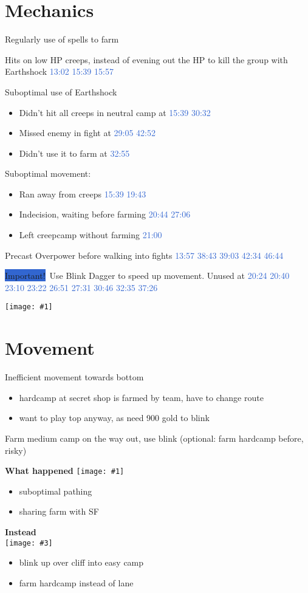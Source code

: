 \documentclass{article}
\newcommand{\gt}{\ensuremath{\;\;\color{green} \filledmedtriangleup} }
\newcommand{\rt}{\ensuremath{\;\;\color{red} \filledmedtriangledown} }
\newcommand{\ws}{\ensuremath{\;\;\color{white} \filledmedsquare} }
\newenvironment{remarks}
    {
        \begin{description}
            \setlength\itemsep{0em}
    }
    {
        \end{description}
    }
\newcommand{\goodremark}[1]{\item[\gt] #1}
\newcommand{\neutralremark}[1]{\item[\ws] #1}
\newcommand{\badremark}[1]{\item[\rt] #1}
\newcommand{\logremark}[2]{\item[\textnormal{\logref{#1}}] #2}
\newcommand{\important}{\colorbox{highlight}{Important!}\ }
\newcommand{\logref}[1]{\textcolor{highlight}{#1}}
\newcommand{\minimap}[1]{
    \begin{center}
    \begin{minipage}[t]{0.3\textwidth}
        \texttt{[image: \#1]}
    \end{minipage}
\end{center}
}
\newcommand{\twominimapscomment}[4]{
\begin{center}
    \begin{minipage}[t]{0.42\textwidth}
    \begin{center}
        \textbf{What happened}\hfill
        \texttt{[image: \#1]} 
        \begin{itemize}
        #2
        \end{itemize}
    \end{center}
    \end{minipage}
    \begin{minipage}[t]{0.42\textwidth}
        \begin{center}
        \textbf{Instead}\hfill\\
        \texttt{[image: \#3]}
        \begin{itemize}
        #4
        \end{itemize}
        \end{center}
    \end{minipage} 
    \end{center}
}
\begin{document}
\pagebreak

\section{Mechanics}
\begin{remarks}
\goodremark{Regularly use of spells to farm}
\neutralremark{Hits on low HP creeps, instead of evening out the HP to kill the group with Earthshock \logref{13:02} \logref{15:39} \logref{15:57} }
\neutralremark{Suboptimal use of Earthshock
\begin{itemize}
    \item Didn't hit all creeps in neutral camp at \logref{15:39} \logref{30:32}
    \item Missed enemy in fight at \logref{29:05} \logref{42:52}
    \item Didn't use it to farm at \logref{32:55}
\end{itemize}
}
\neutralremark{Suboptimal movement:
\begin{itemize}
    \item Ran away from creeps \logref{15:39} \logref{19:43}
    \item Indecision, waiting before farming \logref{20:44} \logref{27:06}
    \item Left creepcamp without farming \logref{21:00}
\end{itemize}
}
\badremark{ Precast Overpower before walking into fights \logref{13:57} \logref{38:43} \logref{39:03} \logref{42:34} \logref{46:44} }
\badremark{ \important Use Blink Dagger to speed up movement. Unused at \logref{20:24} \logref{20:40} \logref{23:10} \logref{23:22} \logref{26:51} \logref{27:31} \logref{30:46} \logref{32:35} \logref{37:26}
\minimap{img/2010blinks.pdf}
}
\end{remarks}

\pagebreak
\section{Movement}
\begin{remarks}
\logremark{15:08}{Inefficient movement towards bottom
\begin{itemize}
    \item hardcamp at secret shop is farmed by team, have to change route
    \item want to play top anyway, as need 900 gold to blink
\end{itemize}
    }

\logremark{37:26}{Farm medium camp on the way out, use blink (optional: farm hardcamp before, risky) }

\logremark{38:05}{
\twominimapscomment{img/3805bad.pdf}{\item suboptimal pathing \item sharing farm with SF}
{img/3805good.pdf}{\item blink up over cliff into easy camp \item farm hardcamp instead of lane}}
\end{remarks}
\end{document}
